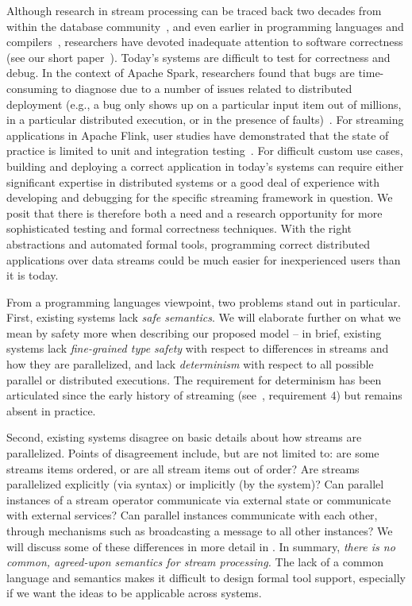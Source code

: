 Although research in stream processing can be traced back two decades from within the database community~\cite{Aurora,Borealis,STREAM2004,Telegraph,ABW2006CQL},
and even earlier in programming languages and compilers~\cite{burge1975stream,stephens1997survey,thies2002streamit},
researchers have devoted inadequate attention to software correctness (see our short paper~).
Today's systems are difficult to test for correctness and debug. In the context of Apache Spark, researchers found that bugs are time-consuming to diagnose due to a number of issues related to distributed deployment (e.g., a bug only shows up on a particular input item out of millions, in a particular distributed execution, or in the presence of faults)~\cite{gulzar2016bigdebug}. For streaming applications in Apache Flink, user studies have demonstrated that the state of practice is limited to unit and integration testing~\cite{vianna2019exploratory}.
For difficult custom use cases, building and deploying a correct application in today's systems can require either significant expertise in distributed systems or a good deal of experience with developing and debugging for the specific streaming framework in question. We posit that there is therefore both a need and a research opportunity for more sophisticated testing and formal correctness techniques. With the right abstractions and automated formal tools, programming correct distributed applications over data streams could be much easier for inexperienced users than it is today.

From a programming languages viewpoint, two problems stand out in particular. First, existing systems lack \emph{safe semantics}. We will elaborate further on what we mean by safety more when describing our proposed model -- in brief, existing systems lack \emph{fine-grained type safety} with respect to differences in streams and how they are parallelized, and lack \emph{determinism} with respect to all possible parallel or distributed executions. The requirement for determinism has been articulated since the early history of streaming (see~\cite{stonebraker20058}, requirement 4) but remains absent in practice.

Second, existing systems disagree on basic details about how streams are parallelized. Points of disagreement include, but are not limited to: are some streams items ordered, or are all stream items out of order? Are streams parallelized explicitly (via syntax) or implicitly (by the system)? Can parallel instances of a stream operator communicate via external state or communicate with external services? Can parallel instances communicate with each other, through mechanisms such as broadcasting a message to all other instances? We will discuss some of these differences in more detail in . In summary, \emph{there is no common, agreed-upon semantics for stream processing.} The lack of a common language and semantics makes it difficult to design formal tool support, especially if we want the ideas to be applicable across systems.

